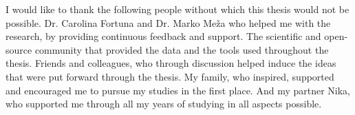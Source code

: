 \documentclass[
11pt, %
english, %
singlespacing, %
headsepline, %
]{MastersDoctoralThesis} %
\begin{document}

\begin{acknowledgements}
\addchaptertocentry{\acknowledgementname} %
I would like to thank the following people without which this thesis would not be possible.
Dr. Carolina Fortuna and Dr. Marko Meža who helped me with the research, by providing continuous feedback and support.
The scientific and open-source community that provided the data and the tools used throughout the thesis.
Friends and colleagues, who through discussion helped induce the ideas that were put forward through the thesis. 
My family, who inspired, supported and encouraged me to pursue my studies in the first place.
And my partner Nika, who supported me through all my years of studying in all aspects possible.

\end{acknowledgements}


\tableofcontents %

\listoffigures %

\listoftables %

\end{document}
